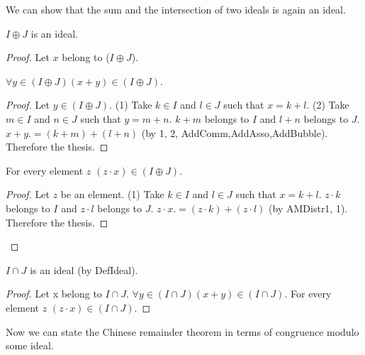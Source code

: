 \documentclass{article}
\begin{document}
  We can show that the sum and the intersection of two ideals is again an ideal.

  \begin{forthel}
    \begin{lemma}\label{IdeSum}
      $I \oplus J$ is an ideal.
    \end{lemma}
    \begin{proof}
      Let $x$ belong to ($I \oplus J$).

      $\forall y \in (I \oplus J) (x + y) \in (I \oplus J)$.
      \begin{proof}
        Let $y \in (I \oplus J)$.
        (1) Take $k \in I$ and $l \in J$ such that $x = k + l$.
        (2) Take $m \in I$ and $n \in J$ such that $y = m + n$.
        $k + m$ belongs to $I$ and $l + n$ belongs to $J$.
        $x + y .= (k + m) + (l + n)$ (by 1, 2, AddComm,AddAsso,AddBubble).
        Therefore the thesis.
      \end{proof}

      For every element $z$ $(z \cdot x) \in (I \oplus J)$.
      \begin{proof}
        Let $z$ be an element.
        (1) Take $k \in I$ and $l \in J$ such that $x = k + l$.
        $z \cdot k$ belongs to $I$ and $z \cdot l$ belongs to $J$.
        $z \cdot x .= (z \cdot k) + (z \cdot l)$ (by AMDistr1, 1).
        Therefore the thesis.
      \end{proof}
    \end{proof}


    \begin{lemma}\label{IdeInt}
      $I \cap J$ is an ideal (by DefIdeal).
    \end{lemma}
    \begin{proof}
      Let x belong to $I \cap J$.
      $\forall y \in (I \cap J) (x + y) \in (I \cap J)$.
      For every element $z$ $(z \cdot x) \in (I \cap J)$.
    \end{proof}
  \end{forthel}

  Now we can state the Chinese remainder theorem in terms of congruence modulo
  some ideal.
\end{document}
